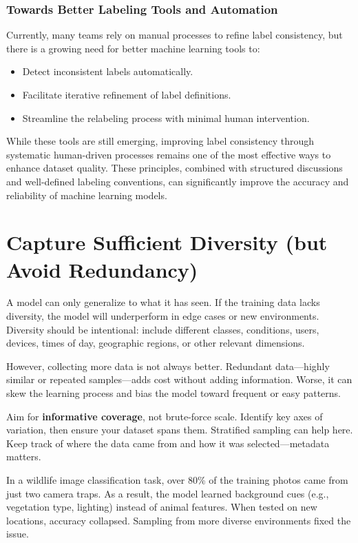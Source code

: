 \documentclass[12pt,openany, draft]{book}
\begin{document}
\subsubsection{Towards Better Labeling Tools and Automation}
Currently, many teams rely on manual processes to refine label consistency, but there is a growing need for better machine learning tools to:
\begin{itemize}
    \item Detect inconsistent labels automatically.
    \item Facilitate iterative refinement of label definitions.
    \item Streamline the relabeling process with minimal human intervention.
\end{itemize}

While these tools are still emerging, improving label consistency through systematic human-driven processes remains one of the most effective ways to enhance dataset quality. These principles, combined with structured discussions and well-defined labeling conventions, can significantly improve the accuracy and reliability of machine learning models.



\section{Capture Sufficient Diversity (but Avoid Redundancy)}

A model can only generalize to what it has seen. If the training data lacks diversity, the model will underperform in edge cases or new environments. Diversity should be intentional: include different classes, conditions, users, devices, times of day, geographic regions, or other relevant dimensions.

However, collecting more data is not always better. Redundant data—highly similar or repeated samples—adds cost without adding information. Worse, it can skew the learning process and bias the model toward frequent or easy patterns.

Aim for \textbf{informative coverage}, not brute-force scale. Identify key axes of variation, then ensure your dataset spans them. Stratified sampling can help here. Keep track of where the data came from and how it was selected—metadata matters.

\begin{examplebox}
In a wildlife image classification task, over 80\% of the training photos came from just two camera traps. As a result, the model learned background cues (e.g., vegetation type, lighting) instead of animal features. When tested on new locations, accuracy collapsed. Sampling from more diverse environments fixed the issue.
\end{examplebox}
\end{document}
